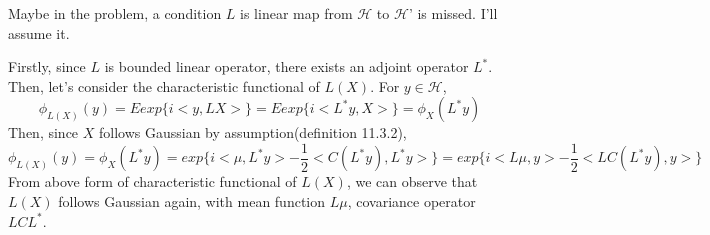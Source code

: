 \documentclass{article}
\begin{document}
Maybe in the problem, a condition $L$ is linear map from $\mathcal{H}$ to $\mathcal{H}$' is missed. I'll assume it.

Firstly, since $L$ is bounded linear operator, there exists an adjoint operator $L^*$.
Then, let's consider the characteristic functional of $L(X)$. 
For $y\in\mathcal{H}$,
\[\phi_{L(X)}(y)=Eexp\{i<y,LX>\}=Eexp\{i<L^*y,X>\}=\phi_X(L^*y)\]
Then, since $X$ follows Gaussian by assumption(definition 11.3.2),
\[\phi_{L(X)}(y)=\phi_X(L^*y)=exp\{i<\mu,L^*y>-\frac{1}{2}<C(L^*y),L^*y>\}
=exp\{i<L\mu,y>-\frac{1}{2}<LC(L^*y),y>\}\]
From above form of characteristic functional of $L(X)$, we can observe that $L(X)$ follows Gaussian again, with
mean function $L\mu$, covariance operator $LCL^*$.
\end{document}
